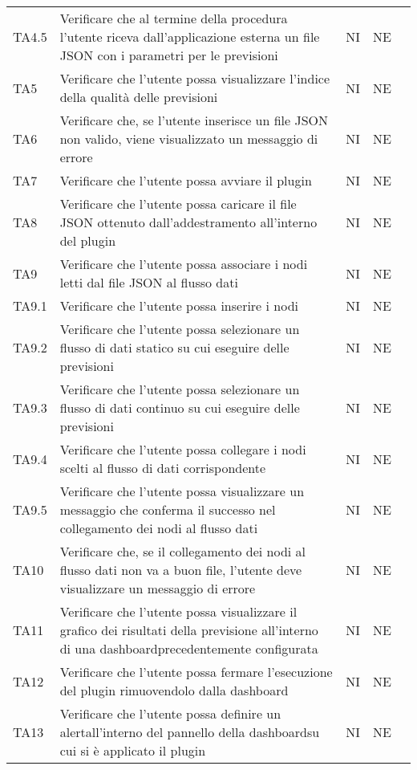 \begin{longtable} {
		>{}p{15mm} 
		>{}p{79.5mm}
		>{}p{15mm} 
		>{}p{15mm}
		>{}p{0mm}}
	TA4.5 & Verificare che al termine della procedura l'utente riceva dall'applicazione esterna un file JSON con i parametri per le previsioni & NI & NE  &\TBstrut \\ [2mm]
	TA5 & Verificare che l'utente possa visualizzare l'indice della qualità delle previsioni & NI & NE  &\TBstrut \\ [2mm]
	TA6 & Verificare che, se l'utente inserisce un file JSON non valido, viene visualizzato un messaggio di errore & NI & NE  &\TBstrut \\ [2mm]
	TA7 & Verificare che l'utente possa avviare il plugin & NI & NE  &\TBstrut \\ [2mm]
	TA8 & Verificare che l'utente possa caricare il file JSON ottenuto dall'addestramento all'interno del plugin & NI & NE  &\TBstrut \\ [2mm]
	TA9 & Verificare che l'utente possa associare i nodi letti dal file JSON al flusso dati & NI & NE  &\TBstrut \\ [2mm]
	TA9.1 & Verificare che l'utente possa inserire i nodi & NI & NE  &\TBstrut \\ [2mm]
	TA9.2 & Verificare che l'utente possa selezionare un flusso di dati statico su cui eseguire delle previsioni & NI & NE  &\TBstrut \\ [2mm]
	TA9.3 & Verificare che l'utente possa selezionare un flusso di dati continuo su cui eseguire delle previsioni & NI & NE  &\TBstrut \\ [2mm]
	TA9.4 & Verificare che l'utente possa collegare i nodi scelti al flusso di dati corrispondente & NI & NE  &\TBstrut \\ [2mm]
	TA9.5 & Verificare che l'utente possa visualizzare un messaggio che conferma il successo nel collegamento dei nodi al flusso dati & NI & NE  &\TBstrut \\ [2mm]
	TA10 & Verificare che, se il collegamento dei nodi al flusso dati non va a buon file, l'utente deve visualizzare un messaggio di errore & NI & NE  &\TBstrut \\ [2mm]
	TA11 & Verificare che l'utente possa visualizzare il grafico dei risultati della previsione all'interno di una dashboard\glosp precedentemente configurata & NI & NE  &\TBstrut \\ [2mm]
	TA12 & Verificare che l'utente possa fermare l'esecuzione del plugin rimuovendolo dalla dashboard\glo & NI & NE  &\TBstrut \\ [2mm]
	TA13 & Verificare che l'utente possa definire un alert\glosp all'interno del pannello della dashboard\glosp su cui si è applicato il plugin & NI & NE  &\TBstrut \\ [2mm]

\end{longtable}
